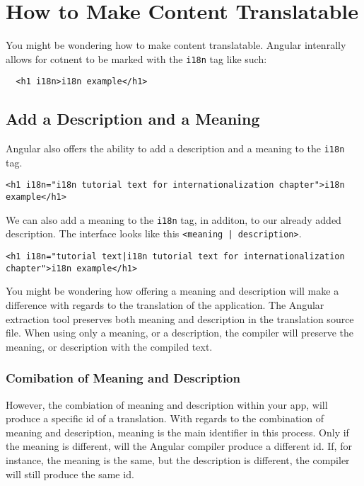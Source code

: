 \section{How to Make Content Translatable}
You might be wondering how to make content translatable. Angular intenrally 
allows for cotnent to be marked with the \lstinline{i18n} tag like such: 
\begin{lstlisting}
  <h1 i18n>i18n example</h1>
\end{lstlisting}


\subsection{Add a Description and a Meaning}
Angular also offers the ability to add a description and a meaning to the
\lstinline{i18n} tag. 
\begin{lstlisting}[caption=i18n description]
<h1 i18n="i18n tutorial text for internationalization chapter">i18n example</h1>
\end{lstlisting}

We can also add a meaning to the \lstinline{i18n} tag, in additon, to our 
already added description. The interface looks like this 
\lstinline{<meaning | description>}.

\begin{lstlisting}[caption=i18n \lstinline{<meaning | description>} Example]
<h1 i18n="tutorial text|i18n tutorial text for internationalization chapter">i18n example</h1>
\end{lstlisting}

You might be wondering how offering a meaning and description will make a 
difference with regards to the translation of the application. The Angular 
extraction tool preserves both meaning and description in the translation 
source file. When using only a meaning, or a description, the compiler will
preserve the meaning, or description with the compiled text. 

\subsubsection{Comibation of Meaning and Description}
However, the combiation of meaning and description within your app, will produce 
a specific id of a translation. With regards to the combination of meaning and 
description, meaning is the main identifier in this process. Only if the meaning 
is different, will the Angular compiler produce a different id. If, for instance, 
the meaning is the same, but the description is different, the compiler will 
still produce the same id. 

